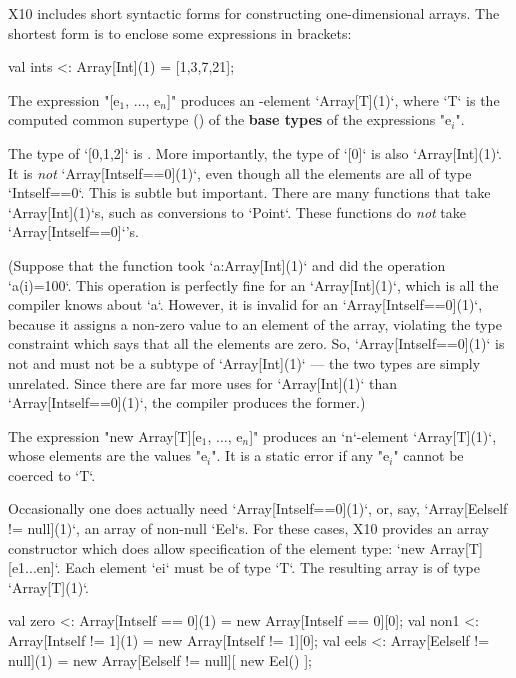 X10 includes short syntactic forms for constructing one-dimensional arrays.
The shortest form is to enclose some expressions in brackets: 
\begin{xten}
val ints <: Array[Int](1) = [1,3,7,21];
\end{xten}

The expression \xcdmath"[e$_1$, $\ldots$, e$_n$]" produces an -element
\xcd`Array[T](1)`, where \xcd`T` is the computed common supertype () of the {\bf
base types} of the expressions  \xcdmath"e$_i$". 

\begin{ex}
The type of
\xcd`[0,1,2]` is .    
More importantly, the type of 
\xcd`[0]` is also \xcd`Array[Int](1)`.  It is {\em not} 
\xcd`Array[Int{self==0}](1)`, even though all the elements are all 
of type \xcd`Int{self==0}`.  This is subtle but important. There are many
functions that take \xcd`Array[Int](1)`s, such as conversions to \xcd`Point`.
These functions do {\em not} take
\xcd`Array[Int{self==0}]`'s.

(Suppose that the function took \xcd`a:Array[Int](1)` and did 
the operation \xcd`a(i)=100`.   This operation is perfectly fine for
an \xcd`Array[Int](1)`, which is all the compiler knows about \xcd`a`.  
However, it is invalid for an \xcd`Array[Int{self==0}](1)`, because it assigns
a non-zero value to an element of the array, violating the type constraint
which says that all the elements are zero.  So, \xcd`Array[Int{self==0}](1)`
is not and must not be a subtype of \xcd`Array[Int](1)` --- the two types are simply unrelated.
Since there are far more uses for \xcd`Array[Int](1)` than
\xcd`Array[Int{self==0}](1)`, the compiler produces the former.)
\end{ex}

The expression \xcdmath"new Array[T][e$_1$, $\ldots$, e$_n$]"
produces 
an \xcd`n`-element \xcd`Array[T](1)`, whose elements are the values
\xcdmath"e$_i$".  It is a static error if any \xcdmath"e$_i$" cannot be
coerced to \xcd`T`.


\begin{ex}
Occasionally one does actually need \xcd`Array[Int{self==0}](1)`, 
or, say, \xcd`Array[Eel{self != null}](1)`, an array of non-null \xcd`Eel`s.  
For these cases, X10 provides an array constructor which does allow
specification of the element type: \xcd`new Array[T][e1...en]`.  Each
element \xcd`ei` must be of type \xcd`T`.  The resulting array is of type
\xcd`Array[T](1)`.  
\begin{xten}
val zero <: Array[Int{self == 0}](1) 
          = new Array[Int{self == 0}][0];
val non1 <: Array[Int{self != 1}](1) 
          = new Array[Int{self != 1}][0];
val eels <: Array[Eel{self != null}](1) 
          = new Array[Eel{self != null}][ new Eel() ];
\end{xten}
\end{ex}


